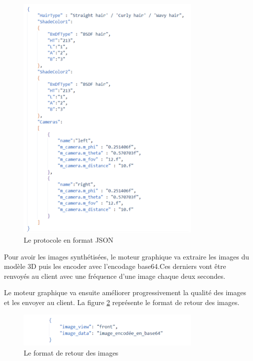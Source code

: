 \begin{figure}[!ht]
\includegraphics[width=0.8\textwidth,angle=00]{chapitres/chapitre3/figures/JSON.png}
\caption{Le protocole en format JSON}
\label{fig:figJSON}
\end{figure}

\newpage
Pour avoir les images synthétisées, le moteur graphique va extraire les images du modèle 3D puis les encoder avec l’encodage base64.Ces derniers vont être renvoyés au client avec une fréquence d’une image chaque deux secondes.

Le moteur graphique va ensuite améliorer progressivement la qualité des images et les envoyer au client.
La figure \ref{fig:figImage} représente le format de retour des images. 

\begin{figure}[!ht]
\includegraphics[width=0.8\textwidth,angle=00]{chapitres/chapitre3/figures/JSON-2.png}
\caption{Le format de retour des images}
\label{fig:figImage}
\end{figure}



